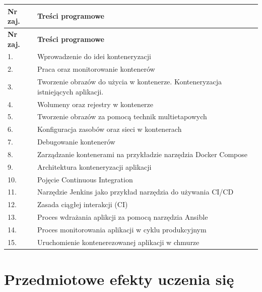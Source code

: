 \documentclass[12pt, a4paper]{article}
\newcommand{\thdrule}{\noalign{\global\setlength{\extrarowheight}{0pt}}}
\newcommand{\thdend}{\noalign{\global\setlength{\extrarowheight}{3pt}}}
\begin{document}
{\scriptsize
\begin{longtable}{m{1.5cm}m{14.5cm}}
\thdrule\toprule
\rowcolor{pjatkRed} {\color{white}\textbf{Nr zaj.}} & {\color{white}\textbf{Treści programowe}} \\
\midrule\thdend
\endfirsthead
\thdrule\toprule
\rowcolor{pjatkRed} {\color{white}\textbf{Nr zaj.}} & {\color{white}\textbf{Treści programowe}} \\
\midrule\thdend
\endhead
  \rowcolor{tableRowLight} 1. & Wprowadzenie do idei konteneryzacji \\
  \rowcolor{tableRowAlt} 2. & Praca oraz monitorowanie kontenerów \\
  \rowcolor{tableRowLight} 3. & Tworzenie obrazów do użycia w kontenerze. Konteneryzacja istniejących aplikacji. \\
  \rowcolor{tableRowAlt} 4. & Wolumeny oraz rejestry  w kontenerze \\
  \rowcolor{tableRowLight} 5. & Tworzenie obrazów za pomocą technik multietapowych \\
  \rowcolor{tableRowAlt} 6. & Konfiguracja zasobów oraz sieci w kontenerach \\
  \rowcolor{tableRowLight} 7. & Debugowanie kontenerów \\
  \rowcolor{tableRowAlt} 8. & Zarządzanie kontenerami na przykładzie narzędzia Docker Compose \\
  \rowcolor{tableRowLight} 9. & Architektura konteneryzacji aplikacji \\
  \rowcolor{tableRowAlt} 10. & Pojęcie Continuous Integration \\
  \rowcolor{tableRowLight} 11. & Narzędzie Jenkins jako przykład narzędzia do używania CI/CD \\
  \rowcolor{tableRowAlt} 12. & Zasada ciągłej interakcji (CI) \\
  \rowcolor{tableRowLight} 13. & Proces wdrażania aplikcji za pomocą narzędzia Ansible \\
  \rowcolor{tableRowAlt} 14. & Proces monitorowania aplikacji w cyklu produkcyjnym \\
  \rowcolor{tableRowLight} 15. & Uruchomienie kontenerezowanej aplikacji w chmurze \\
\bottomrule
\end{longtable}}

\section{Przedmiotowe efekty uczenia się}
\end{document}
